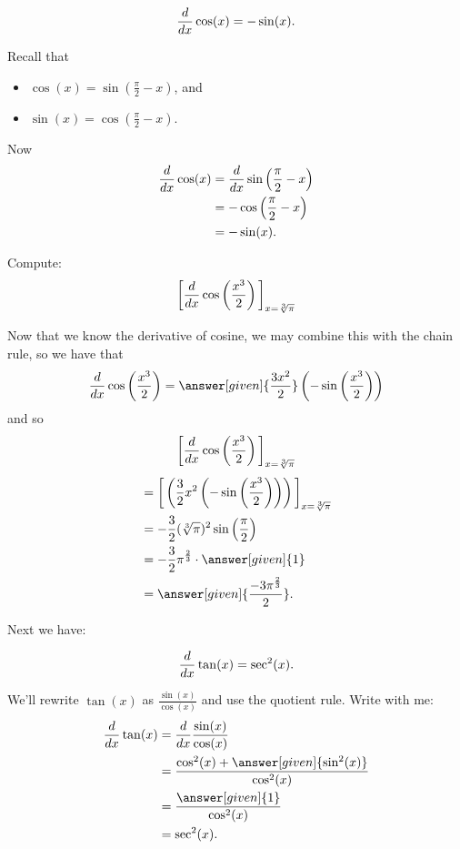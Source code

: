 \documentclass{ximera}
\begin{document}
\begin{theorem}
	\[ \frac{d}{\mathop{}\!d x} \cos(x) = -\sin(x).\]
	\begin{explanation}
	Recall that
	\begin{itemize}
		\item $\cos(x) = \sin\left(\frac{\pi}{2}-x\right)$, and
		\item $\sin(x) = \cos\left(\frac{\pi}{2}-x\right)$.
	\end{itemize}
	Now
	\begin{align*}
		\frac{d}{\mathop{}\!d x} \cos(x) &= \frac{d}{\mathop{}\!d x} \sin\left(\frac{\pi}{2}-x\right)\\
			&=-\cos\left(\frac{\pi}{2}-x\right) \\
			&= -\sin(x).
	\end{align*}
	\end{explanation}
\end{theorem}

\begin{example}
	Compute:
	\[ \bigg[ \frac{d}{\mathop{}\!d x} \cos \left( \frac{x^3}{2} \right) \bigg]_{x=\sqrt[3]{\pi}} \]
\begin{explanation}
Now that we know the derivative of cosine, we may combine this with the
chain rule, so we have that
\[
\ddx \cos \left( \frac{x^3}{2} \right) = \answer[given]{\frac{3 x^2}{2}} \left(- \sin \left( \frac{x^3}{2} \right) \right)
\]
and so
\[
\bigg[ \frac{d}{\mathop{}\!d x} \cos \left( \frac{x^3}{2} \right) \bigg]_{x=\sqrt[3]{\pi}}
\]
\begin{align*}
  &= \eval{\left( \frac{3}{2} x^2 \left(- \sin \left( \frac{x^3}{2}
    \right) \right) \right)}_{x=\sqrt[3]{\pi}} \\
  &= - \frac{3}{2}(\sqrt[3]{\pi})^2 \sin \left( \frac{\pi}{2} \right) \\
  &= -\frac{3}{2} \pi^{\frac{2}{3}} \cdot \answer[given]{1} \\
  &=\answer[given]{\frac{-3 \pi^{\frac{2}{3}}}{2}}.
\end{align*}
\end{explanation}
\end{example}


Next we have:

\begin{theorem}
\[
\frac{d}{\mathop{}\!d x} \tan(x) = \sec^2(x).
\]

\begin{explanation}
We'll rewrite $\tan(x)$ as $\frac{\sin(x)}{\cos(x)}$ and use the
quotient rule. Write with me:
\begin{align*}
\ddx\tan(x) &= \ddx\frac{\sin(x)}{\cos(x)}\\
&=\frac{\cos^2(x) + \answer[given]{\sin^2(x)}}{\cos^2(x)}\\
&=\frac{\answer[given]{1}}{\cos^2(x)}\\
&=\sec^2(x).
\end{align*}
\end{explanation}
\end{theorem}
\end{document}
